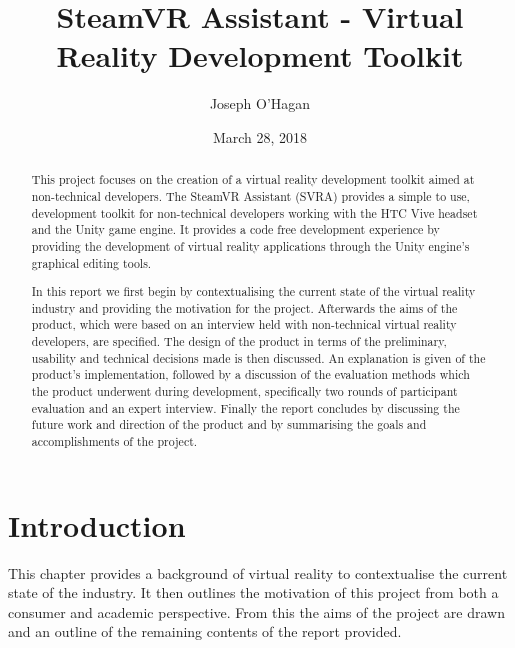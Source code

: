 \documentclass{l4proj}
\begin{document}
\title{SteamVR Assistant - Virtual Reality Development Toolkit}
\author{Joseph O'Hagan}
\date{March 28, 2018}
\maketitle

\begin{abstract}
This project focuses on the creation of a virtual reality development toolkit aimed at non-technical developers. The SteamVR Assistant (SVRA) provides a simple to use, development toolkit for non-technical developers working with the HTC Vive headset and the Unity game engine. It provides a code free development experience by providing the development of virtual reality applications through the Unity engine's graphical editing tools. 

In this report we first begin by contextualising the current state of the virtual reality industry and providing the motivation for the project. Afterwards the aims of the product, which were based on an interview held with non-technical virtual reality developers, are specified. The design of the product in terms of the preliminary, usability and technical decisions made is then discussed. An explanation is given of the product's implementation, followed by a discussion of the evaluation methods which the product underwent during development, specifically two rounds of participant evaluation and an expert interview. Finally the report concludes by discussing the future work and direction of the product and by summarising the goals and accomplishments of the project. 

\end{abstract}

\educationalconsent
%
%
\tableofcontents

\chapter{Introduction}
This chapter provides a background of virtual reality to contextualise the current state of the industry. It then outlines the motivation of this project from both a consumer and academic perspective. From this the aims of the project are drawn and an outline of the remaining contents of the report provided.  
\end{document}
